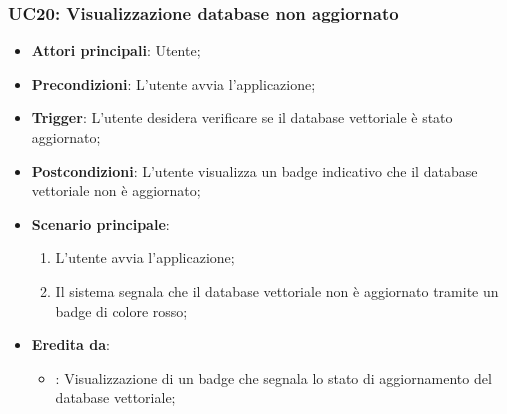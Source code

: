 \hypertarget{UC20}{}
\subsubsection{UC20: Visualizzazione database non aggiornato}
\begin{itemize}
    \item \textbf{Attori principali}: Utente;
    \item \textbf{Precondizioni}: L'utente avvia l'applicazione;
    \item \textbf{Trigger}: L'utente desidera verificare se il database vettoriale è stato aggiornato;
    \item \textbf{Postcondizioni}: L'utente visualizza un badge indicativo che il database vettoriale non è aggiornato;
    \item \textbf{Scenario principale}:
    \begin{enumerate}
        \item L'utente avvia l'applicazione;
        \item Il sistema segnala che il database vettoriale non è aggiornato tramite un badge di colore rosso;
    \end{enumerate}
    \item \textbf{Eredita da}:
    \begin{itemize}
        \item {}: Visualizzazione di un badge che segnala lo stato di aggiornamento del database vettoriale;
    \end{itemize}
\end{itemize}

